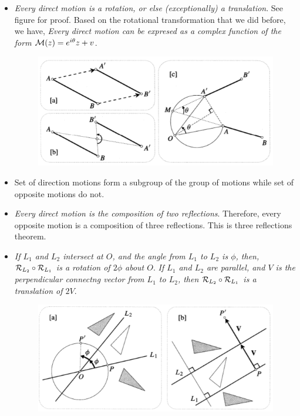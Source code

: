 \documentclass[12pt]{article}
\def\tt{\textit}
\def\mc{\ensuremath\mathcal}
\begin{document}
\begin{itemize}
    \item \tt{Every direct motion is a rotation, or else (exceptionally) a translation}. See figure for proof. Based on the rotational transformation that we did before, we have, \tt{Every direct motion can be expresed as a complex function of the form $\mc{M}(z) = e^{i\theta}z+v$}.

    \begin{figure}[h!]
        \centering
        \includegraphics[scale=0.85]{fig_9}
        \label{f9}
    \end{figure}

    \item Set of direction motions form a subgroup of the group of motions while set of opposite motions do not.

    \item \tt{Every direct motion is the composition of two reflections}. Therefore, every opposite motion is a composition of three reflections. This is three reflections theorem.

    \item \tt{If $L_1$ and $L_2$ intersect at $O$, and the angle from $L_1$ to $L_2$ is $\phi$, then, $\mc{R}_{L_2} \circ \mc{R}_{L_1}$ is a rotation of $2\phi$ about $O$}. \tt{If $L_1$ and $L_2$ are parallel, and $V$ is the perpendicular connectng vector from $L_1$ to $L_2$, then $\mc{R}_{L_2} \circ \mc{R}_{L_1}$ is a translation of $2V$}.

    \begin{figure}[h!]
        \centering
        \includegraphics[scale=0.85]{fig_10}
        \label{f10}
    \end{figure}


\end{itemize}
\end{document}
